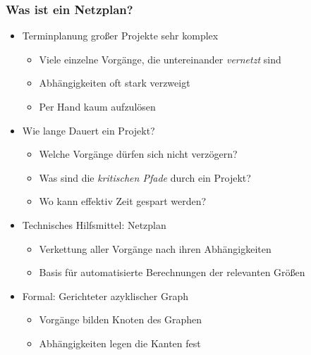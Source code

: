 \documentclass[ngerman, t]{beamer}
\begin{document}
\begin{frame}
  \frametitle{Was ist ein Netzplan?}
  \begin{itemize}
    \item Terminplanung gro{\ss}er Projekte sehr komplex
      \begin{itemize}
        \item Viele einzelne Vorg\"ange, die untereinander
          \textit{vernetzt} sind
        \item Abh\"angigkeiten oft stark verzweigt
        \item Per Hand kaum aufzul\"osen
      \end{itemize}
    \item Wie lange Dauert ein Projekt?
      \begin{itemize}
        \item Welche Vorg\"ange d\"urfen sich nicht verz\"ogern?
        \item Was sind die \textit{kritischen Pfade} durch ein
          Projekt?
        \item Wo kann effektiv Zeit gespart werden?
      \end{itemize}
    \item Technisches Hilfsmittel: Netzplan
      \begin{itemize}
        \item Verkettung aller Vorg\"ange nach ihren Abh\"angigkeiten
        \item Basis f\"ur automatisierte Berechnungen der relevanten
          Gr\"o{\ss}en
      \end{itemize}
    \item Formal: Gerichteter azyklischer Graph
      \begin{itemize}
        \item Vorg\"ange bilden Knoten des Graphen
        \item Abh\"angigkeiten legen die Kanten fest
      \end{itemize}
  \end{itemize}
\end{frame}
\end{document}
